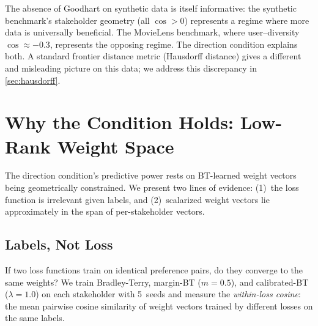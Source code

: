 \documentclass[11pt,letterpaper]{article}
\begin{document}
The absence of Goodhart on synthetic data is itself informative: the
synthetic benchmark's stakeholder geometry (all $\cos > 0$)
represents a regime where more data is universally beneficial. The
MovieLens benchmark, where user--diversity $\cos \approx -0.3$,
represents the opposing regime. The direction condition explains both.
A standard frontier distance metric (Hausdorff distance) gives a
different and misleading picture on this data; we address this
discrepancy in \cref{sec:hausdorff}.

\section{Why the Condition Holds: Low-Rank Weight Space}
\label{sec:lowrank}

The direction condition's predictive power rests on BT-learned weight
vectors being geometrically constrained. We present two lines of
evidence: (1)~the loss function is irrelevant given labels, and
(2)~scalarized weight vectors lie approximately in the span of
per-stakeholder vectors.

\subsection{Labels, Not Loss}

If two loss functions train on identical preference pairs, do they
converge to the same weights? We train Bradley-Terry, margin-BT
($m{=}0.5$), and calibrated-BT ($\lambda{=}1.0$) on each stakeholder
with 5~seeds and measure the \emph{within-loss cosine}: the mean
pairwise cosine similarity of weight vectors trained by different
losses on the same labels.
\end{document}
